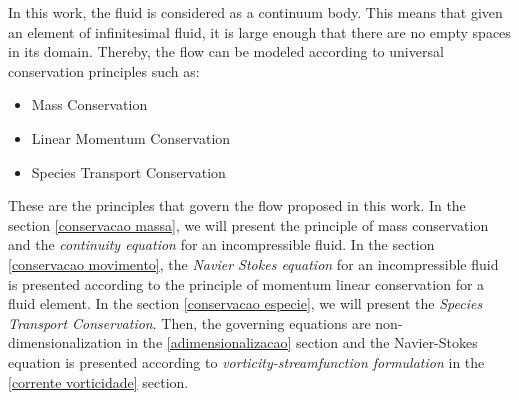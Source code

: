 In this work, the fluid is considered as a continuum body. 
This means that given an element of infinitesimal fluid,
 it is large enough that there are no empty spaces
 in its domain. Thereby, the flow can be modeled
 according to universal conservation principles such as:

\begin{itemize}
 \item Mass Conservation
 \item Linear Momentum Conservation
 \item Species Transport Conservation
\end{itemize}

These are the principles that govern the flow proposed in this work.
 In the section \ref{conservacao massa}, we will present the principle
 of mass conservation and the \textit{continuity equation} for
 an incompressible fluid. In the section
 \ref{conservacao movimento}, the
 \textit{Navier Stokes equation} for an incompressible fluid
 is presented according to the principle of momentum linear conservation
 for a fluid element. In the section \ref{conservacao especie},
 we will present the \textit{Species Transport Conservation}.
 Then, the governing equations are non-dimensionalization
 in the \ref{adimensionalizacao} section and
 the Navier-Stokes equation is presented according to
 \textit{vorticity-streamfunction formulation} in the
 \ref{corrente vorticidade} section.
